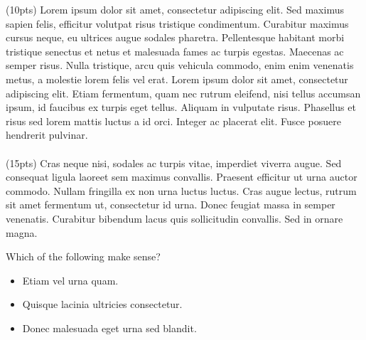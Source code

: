 \documentclass[10pt,a4paper]{article}
\begin{document}
\newpage
{}

\questsection (10pts)
Lorem ipsum dolor sit amet, consectetur adipiscing elit. Sed maximus sapien felis, efficitur volutpat risus tristique condimentum. Curabitur maximus cursus neque, eu ultrices augue sodales pharetra. Pellentesque habitant morbi tristique senectus et netus et malesuada fames ac turpis egestas. Maecenas ac semper risus. Nulla tristique, arcu quis vehicula commodo, enim enim venenatis metus, a molestie lorem felis vel erat. Lorem ipsum dolor sit amet, consectetur adipiscing elit. Etiam fermentum, quam nec rutrum eleifend, nisi tellus accumsan ipsum, id faucibus ex turpis eget tellus. Aliquam in vulputate risus. Phasellus et risus sed lorem mattis luctus a id orci. Integer ac placerat elit. Fusce posuere hendrerit pulvinar.\\[.5em]

\\

\questsection (15pts)
Cras neque nisi, sodales ac turpis vitae, imperdiet viverra augue. Sed consequat ligula laoreet sem maximus convallis. Praesent efficitur ut urna auctor commodo. Nullam fringilla ex non urna luctus luctus. Cras augue lectus, rutrum sit amet fermentum ut, consectetur id urna. Donec feugiat massa in semper venenatis. Curabitur bibendum lacus quis sollicitudin convallis. Sed in ornare magna.\\



\newpage
{}
\questsection  Which of the following make sense?
\begin{itemize}
\item Etiam vel urna quam.  \checked
\item Quisque lacinia ultricies consectetur. \unchecked
\item Donec malesuada eget urna sed blandit. \unchecked
\end{itemize}
\end{document}
